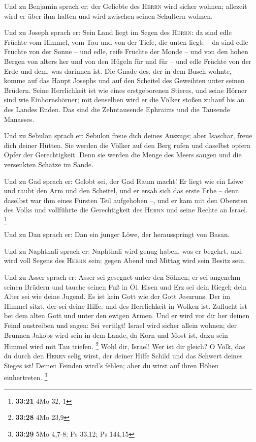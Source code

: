  Und zu Benjamin sprach er: der Geliebte des
\textsc{Herrn} wird sicher wohnen; allezeit wird er über ihm halten und
wird zwischen seinen Schultern wohnen.

 Und zu Joseph sprach er: Sein Land liegt im Segen des
\textsc{Herrn}: da sind edle Früchte vom Himmel, vom Tau und von der
Tiefe, die unten liegt; --  da sind edle Früchte von der
Sonne -- und edle, reife Früchte der Monde --  und von
den hohen Bergen von alters her und von den Hügeln für und für --
 und edle Früchte von der Erde und dem, was darinnen ist.
Die Gnade des, der in dem Busch wohnte, komme auf das Haupt Josephs und
auf den Scheitel des Geweihten unter seinen Brüdern. 
Seine Herrlichkeit ist wie eines erstgeborenen Stieres, und seine Hörner
sind wie Einhornshörner; mit denselben wird er die Völker stoßen zuhauf
bis an des Landes Enden. Das sind die Zehntausende Ephraims und die
Tausende Manasses.

 Und zu Sebulon sprach er: Sebulon freue dich deines
Auszugs; aber Isaschar, freue dich deiner Hütten.  Sie
werden die Völker auf den Berg rufen und daselbst opfern Opfer der
Gerechtigkeit. Denn sie werden die Menge des Meers saugen und die
versenkten Schätze im Sande.

 Und zu Gad sprach er: Gelobt sei, der Gad Raum macht! Er
liegt wie ein Löwe und raubt den Arm und den Scheitel, 
und er ersah sich das erste Erbe -- denn daselbst war ihm eines Fürsten
Teil aufgehoben --, und er kam mit den Obersten des Volks und vollführte
die Gerechtigkeit des \textsc{Herrn} und seine Rechte an Israel.
\footnote{\textbf{33:21} 4Mo 32,-1}

 Und zu Dan sprach er: Dan ein junger Löwe, der
herausspringt von Basan.

 Und zu Naphthali sprach er: Naphthali wird genug haben,
was er begehrt, und wird voll Segens des \textsc{Herrn} sein; gegen
Abend und Mittag wird sein Besitz sein.

 Und zu Asser sprach er: Asser sei gesegnet unter den
Söhnen; er sei angenehm seinen Brüdern und tauche seinen Fuß in Öl.
 Eisen und Erz sei dein Riegel; dein Alter sei wie deine
Jugend.  Es ist kein Gott wie der Gott Jesuruns. Der im
Himmel sitzt, der sei deine Hilfe, und des Herrlichkeit in Wolken ist.
 Zuflucht ist bei dem alten Gott und unter den ewigen
Armen. Und er wird vor dir her deinen Feind austreiben und sagen: Sei
vertilgt!  Israel wird sicher allein wohnen; der Brunnen
Jakobs wird sein in dem Lande, da Korn und Most ist, dazu sein Himmel
wird mit Tau triefen. \footnote{\textbf{33:28} 4Mo 23,9} 
Wohl dir, Israel! Wer ist dir gleich? O Volk, das du durch den
\textsc{Herrn} selig wirst, der deiner Hilfe Schild und das Schwert
deines Sieges ist! Deinen Feinden wird's fehlen; aber du wirst auf ihren
Höhen einhertreten. \footnote{\textbf{33:29} 5Mo 4,7-8; Ps 33,12; Ps
  144,15}

